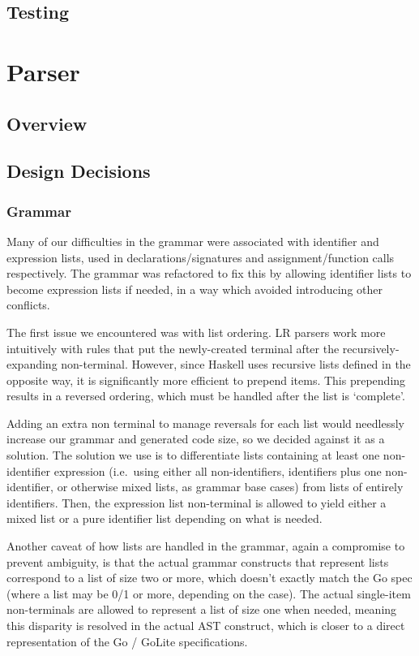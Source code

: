 \documentclass[11pt]{article}
\begin{document}
\subsection{Testing}
\section{Parser}
\subsection{Overview}
\subsection{Design Decisions}
\subsubsection{Grammar}
Many of our difficulties in the grammar were associated with
identifier and expression lists, used in declarations/signatures and
assignment/function calls respectively. The grammar was refactored to
fix this by allowing identifier lists to become expression lists if
needed, in a way which avoided introducing other conflicts.

The first issue we encountered was with list ordering. LR parsers work
more intuitively with rules that put the newly-created terminal after
the recursively-expanding non-terminal. However, since Haskell uses
recursive lists defined in the opposite way, it is significantly more
efficient to prepend items. This prepending results in a reversed
ordering, which must be handled after the list is `complete'.

Adding an extra non terminal to manage reversals for each list would
needlessly increase our grammar and generated code size, so we decided
against it as a solution. The solution we use is to differentiate
lists containing at least one non-identifier expression (i.e.\ using
either all non-identifiers, identifiers plus one non-identifier, or
otherwise mixed lists, as grammar base cases) from lists of entirely
identifiers. Then, the expression list non-terminal is allowed to
yield either a mixed list or a pure identifier list depending on what
is needed.

Another caveat of how lists are handled in the grammar, again a
compromise to prevent ambiguity, is that the actual grammar constructs
that represent lists correspond to a list of size two or more, which
doesn't exactly match the Go spec (where a list may be 0/1 or more,
depending on the case). The actual single-item non-terminals are
allowed to represent a list of size one when needed, meaning this
disparity is resolved in the actual AST construct, which is closer to
a direct representation of the Go / GoLite specifications.
\end{document}
